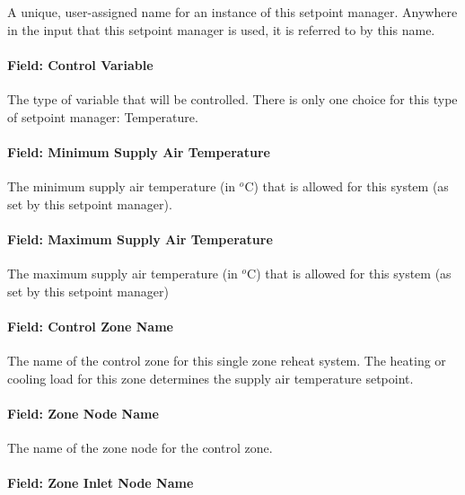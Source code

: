 A unique, user-assigned name for an instance of this setpoint manager. Anywhere in the input that this setpoint manager is used, it is referred to by this name.

\paragraph{Field: Control Variable}\label{field-control-variable-3}

The type of variable that will be controlled. There is only one choice for this type of setpoint manager: Temperature.

\paragraph{Field: Minimum Supply Air Temperature}\label{field-minimum-supply-air-temperature}

The minimum supply air temperature (in \(^{o}\)C) that is allowed for this system (as set by this setpoint manager).

\paragraph{Field: Maximum Supply Air Temperature}\label{field-maximum-supply-air-temperature}

The maximum supply air temperature (in \(^{o}\)C) that is allowed for this system (as set by this setpoint manager)

\paragraph{Field: Control Zone Name}\label{field-control-zone-name-2016-06-16}

The name of the control zone for this single zone reheat system. The heating or cooling load for this zone determines the supply air temperature setpoint.

\paragraph{Field: Zone Node Name}\label{field-zone-node-name-000}

The name of the zone node for the control zone.

\paragraph{Field: Zone Inlet Node Name}\label{field-zone-inlet-node-name}


